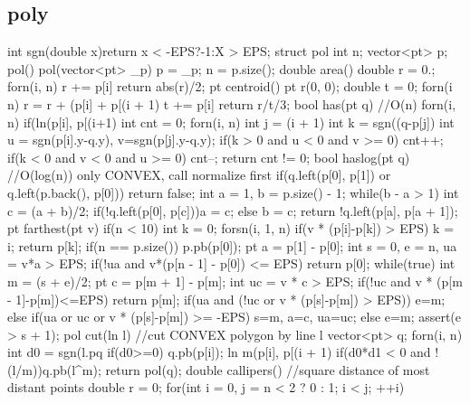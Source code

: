 \documentclass[10pt, landscape, twocolumn, a4paper, notitlepage]{article}
\begin{document}
\subsection{poly}
\begin{code}
int sgn(double x){return x < -EPS?-1:X > EPS;}
struct pol{
    int n; vector<pt> p;
    pol() {}
    pol(vector<pt> _p) {p = _p; n = p.size();}
    double area() {
        double r = 0.;
        forn(i, n) r += p[i]%
        return abs(r)/2;
    }
    pt centroid() {
        pt r(0, 0); double t = 0;
        forn(i n) {
            r = r + (p[i] + p[(i + 1)%
            t += p[i]%
        }
        return r/t/3;
    }
    bool has(pt q) { //O(n)
        forn(i, n) if(ln(p[i], p[(i+1)%
        int cnt = 0;
        forn(i, n) {
            int j = (i + 1)%
            int k = sgn((q-p[j])%
            int u = sgn(p[i].y-q.y), v=sgn(p[j].y-q.y);
            if(k > 0 and u < 0 and v >= 0) cnt++;
            if(k < 0 and v < 0 and u >= 0) cnt--;
        }
        return cnt != 0;
    }
    bool haslog(pt q) { //O(log(n)) only CONVEX, call normalize first
        if(q.left(p[0], p[1]) or q.left(p.back(), p[0])) return false;
        int a = 1, b = p.size() - 1;
        while(b - a > 1) {
            int c = (a + b)/2;
            if(!q.left(p[0], p[c]))a = c;
            else b = c;
        }
        return !q.left(p[a], p[a + 1]);
    }
    pt farthest(pt v) {
        if(n < 10) {
            int k = 0;
            forsn(i, 1, n) if(v * (p[i]-p[k]) > EPS) k = i;
            return p[k];
        }
        if(n == p.size()) p.pb(p[0]);
        pt a = p[1] - p[0];
        int s = 0, e = n, ua = v*a > EPS;
        if(!ua and v*(p[n - 1] - p[0]) <= EPS) return p[0];
        while(true) {
            int m = (s + e)/2; pt c = p[m + 1] - p[m];
            int uc = v * c > EPS;
            if(!uc and v * (p[m - 1]-p[m])<=EPS) return p[m];
            if(ua and (!uc or v * (p[s]-p[m]) > EPS)) e=m;
            else if(ua or uc or v * (p[s]-p[m]) >= -EPS) s=m, a=c, ua=uc;
            else e=m;
            assert(e > s + 1);
        }
    }
    pol cut(ln l) { //cut CONVEX polygon by line l
        vector<pt> q;
        forn(i, n) {
            int d0 = sgn(l.pq%
            if(d0>=0) q.pb(p[i]);
            ln m(p[i], p[(i + 1)%
            if(d0*d1 < 0 and !(l/m))q.pb(l^m);
        }
        return pol(q);
    }
    double callipers() { //square distance of most distant points
        double r = 0;
        for(int i = 0, j = n < 2 ? 0 : 1; i < j; ++i) {
}}}
\end{code}
\end{document}
